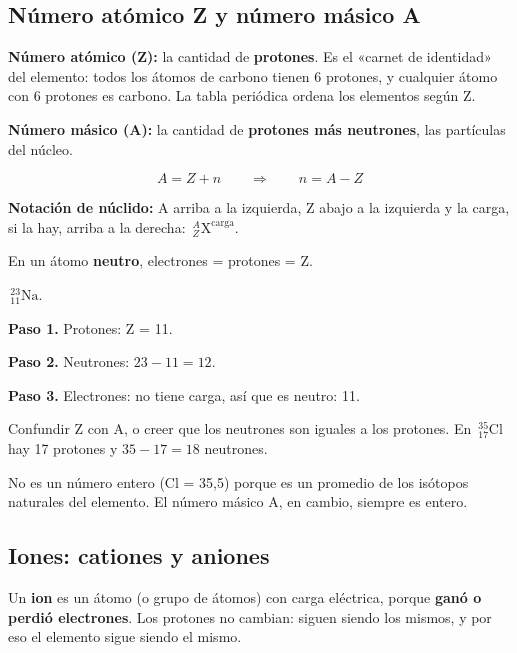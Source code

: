 \subsection{Número atómico Z y número másico A}
\textbf{Número atómico (Z):} la cantidad de \textbf{protones}. Es el «carnet de identidad» del elemento: todos los átomos de carbono tienen 6 protones, y cualquier átomo con 6 protones es carbono. La tabla periódica ordena los elementos según Z.

 

\textbf{Número másico (A):} la cantidad de \textbf{protones más neutrones}, las partículas del núcleo.

 \[ A = Z + n \qquad\Rightarrow\qquad n = A - Z \] 

\textbf{Notación de núclido:} A arriba a la izquierda, Z abajo a la izquierda y la carga, si la hay, arriba a la derecha: $\,{}^{A}_{Z}\text{X}^{\text{carga}}$.

 

En un átomo \textbf{neutro}, electrones = protones = Z.

  
\begin{ejemplo} $\,{}^{23}_{11}\text{Na}$.\par \textbf{Paso 1.} Protones: Z = 11.\par \textbf{Paso 2.} Neutrones: $23 - 11 = 12$.\par \textbf{Paso 3.} Electrones: no tiene carga, así que es neutro: 11.\end{ejemplo}
 
\begin{ojo} Confundir Z con A, o creer que los neutrones son iguales a los protones. En $\,{}^{35}_{17}\text{Cl}$ hay 17 protones y $35 - 17 = 18$ neutrones.\end{ojo}
 
\begin{clave} No es un número entero (Cl = 35,5) porque es un promedio de los isótopos naturales del elemento. El número másico A, en cambio, siempre es entero.\end{clave}
\subsection{Iones: cationes y aniones}
Un \textbf{ion} es un átomo (o grupo de átomos) con carga eléctrica, porque \textbf{ganó o perdió electrones}. Los protones no cambian: siguen siendo los mismos, y por eso el elemento sigue siendo el mismo.

